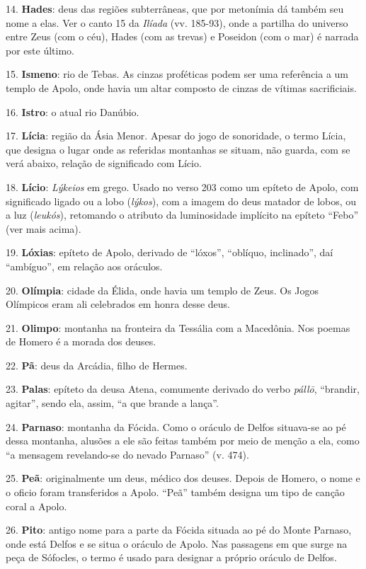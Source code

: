 14. \textbf{Hades}: deus das regiões subterrâneas, que por metonímia dá
também seu nome a elas. Ver o canto 15 da \emph{Ilíada} (vv. 185-93),
onde a partilha do universo entre Zeus (com o céu), Hades (com as
trevas) e Poseidon (com o mar) é narrada por este último.

15. \textbf{Ismeno}: rio de Tebas. As cinzas proféticas podem ser uma
referência a um templo de Apolo, onde havia um altar composto de cinzas
de vítimas sacrificiais.

16. \textbf{Istro}: o atual rio Danúbio.

17. \textbf{Lícia}: região da Ásia Menor. Apesar do jogo de sonoridade,
o termo Lícia, que designa o lugar onde as referidas montanhas se
situam, não guarda, com se verá abaixo, relação de significado com
Lício.

18. \textbf{Lício}: \emph{Lýkeios} em grego. Usado no verso 203 como um
epíteto de Apolo, com significado ligado ou a lobo (\emph{lýkos}), com a
imagem do deus matador de lobos, ou a luz (\emph{leukós}), retomando o
atributo da luminosidade implícito na epíteto ``Febo'' (ver mais acima).

19. \textbf{Lóxias}: epíteto de Apolo, derivado de ``lóxos'', ``oblíquo,
inclinado'', daí ``ambíguo'', em relação aos oráculos.

20. \textbf{Olímpia}: cidade da Élida, onde havia um templo de Zeus. Os
Jogos Olímpicos eram ali celebrados em honra desse deus.

21. \textbf{Olimpo}: montanha na fronteira da Tessália com a Macedônia.
Nos poemas de Homero é a morada dos deuses.

22. \textbf{Pã}: deus da Arcádia, filho de Hermes.

23. \textbf{Palas}: epíteto da deusa Atena, comumente derivado do verbo
\emph{pállō}, ``brandir, agitar'', sendo ela, assim, ``a que brande a
lança''.

24. \textbf{Parnaso}: montanha da Fócida. Como o oráculo de Delfos
situava-se ao pé dessa montanha, alusões a ele são feitas também por
meio de menção a ela, como ``a mensagem revelando-se do nevado Parnaso''
(v. 474).

25. \textbf{Peã}: originalmente um deus, médico dos deuses. Depois de
Homero, o nome e o oficio foram transferidos a Apolo. ``Peã'' também
designa um tipo de canção coral a Apolo.

26. \textbf{Pito}: antigo nome para a parte da Fócida situada ao pé do
Monte Parnaso, onde está Delfos e se situa o oráculo de Apolo. Nas
passagens em que surge na peça de Sófocles, o termo é usado para
designar a próprio oráculo de Delfos.

